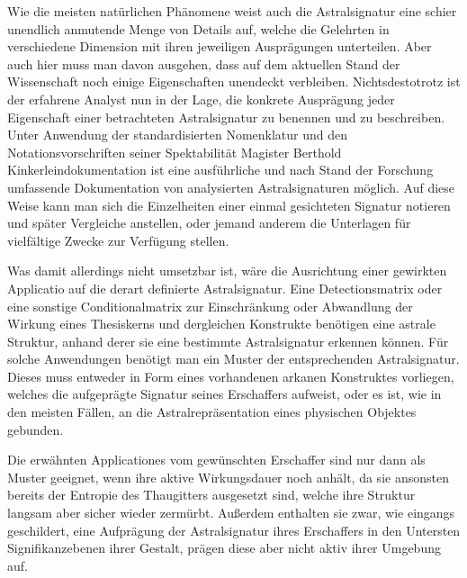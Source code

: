 \documentclass[a5paper,8pt]{book}
\begin{document}
\begin{multicols}{2}
Wie die meisten natürlichen Phänomene weist auch die Astralsignatur eine schier unendlich anmutende Menge von
Details auf, welche die Gelehrten in verschiedene Dimension mit ihren jeweiligen Ausprägungen unterteilen. Aber auch
hier muss man davon ausgehen, dass auf dem aktuellen Stand der Wissenschaft noch einige Eigenschaften unendeckt
verbleiben. Nichtsdestotrotz ist der erfahrene Analyst nun in der Lage, die konkrete Ausprägung jeder Eigenschaft einer
betrachteten Astralsignatur zu benennen und zu beschreiben. Unter Anwendung der standardisierten Nomenklatur und
den Notationsvorschriften seiner Spektabilität Magister Berthold Kinkerleindokumentation ist eine
ausführliche und nach Stand der Forschung umfassende Dokumentation von analysierten Astralsignaturen
möglich. Auf diese Weise kann man sich die Einzelheiten einer einmal gesichteten Signatur notieren und später Vergleiche
anstellen, oder jemand anderem die Unterlagen für vielfältige Zwecke zur Verfügung stellen.

Was damit allerdings nicht umsetzbar ist, wäre die Ausrichtung einer gewirkten Applicatio auf die derart definierte
Astralsignatur. Eine Detectionsmatrix oder eine sonstige Conditionalmatrix zur Einschränkung oder Abwandlung der
Wirkung eines Thesiskerns und dergleichen Konstrukte benötigen eine astrale Struktur, anhand derer sie eine
bestimmte Astralsignatur erkennen können. Für solche Anwendungen benötigt man ein Muster der entsprechenden
Astralsignatur. Dieses muss entweder in Form eines vorhandenen arkanen Konstruktes vorliegen, welches die
aufgeprägte Signatur seines Erschaffers aufweist, oder es ist, wie in den meisten Fällen, an die Astralrepräsentation
eines physischen Objektes gebunden.

Die erwähnten Applicationes vom gewünschten Erschaffer sind nur dann als Muster geeignet, wenn ihre aktive Wirkungsdauer
noch anhält, da sie ansonsten bereits der Entropie des Thaugitters ausgesetzt sind, welche ihre Struktur langsam aber sicher
wieder zermürbt. Außerdem enthalten sie zwar, wie eingangs geschildert, eine Aufprägung der Astralsignatur ihres
Erschaffers in den Untersten Signifikanzebenen ihrer Gestalt, prägen diese aber nicht aktiv ihrer Umgebung
auf.


\end{multicols}
\end{document}
